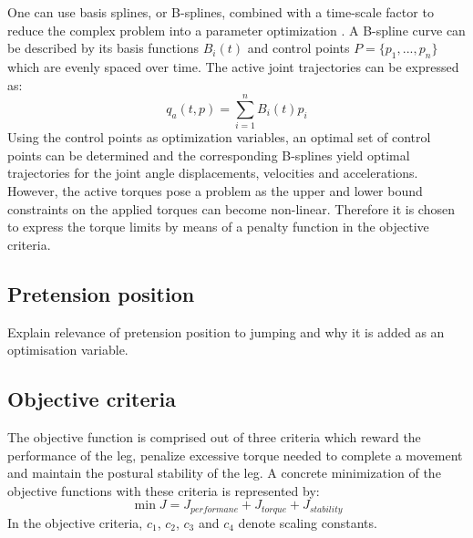 \documentclass[letterpaper, 10 pt, conference]{ieeeconf}  %
\begin{document}
One can use basis splines, or B-splines, combined with a time-scale factor to reduce the complex problem into a parameter optimization \cite{ude2000planning} \cite{babivc2009biarticulated} \cite{wang1999weight} \cite{albro2001optimal}. A B-spline curve can be described by its basis functions $B_i(t)$ and control points $P=\{p_1,...,p_n\}$ which are evenly spaced over time. The active joint trajectories can be expressed as:   
 \begin{equation}
q_a(t,p) = \sum_{i=1}^{n} B_i (t) p_i
\end{equation}
Using the control points as optimization variables, an optimal set of control points can be determined and the corresponding B-splines yield optimal trajectories for the joint angle displacements, velocities and accelerations. However, the active torques pose a problem as the upper and lower bound constraints on the applied torques can become non-linear. Therefore it is chosen to express the torque limits by means of a penalty function in the objective criteria.

\subsection{Pretension position}

Explain relevance of pretension position to jumping and why it is added as an optimisation variable.

\subsection{Objective criteria}

The objective function is comprised out of three criteria which reward the performance of the leg, penalize excessive torque needed to complete a movement and maintain the postural stability of the leg. A concrete minimization of the objective functions with these criteria is represented by:   
 \begin{equation}
\min\limits J =  J_{performane}+ J_{torque}+ J_{stability}
 \end{equation}
In the objective criteria, $c_1$, $c_2$, $c_3$ and $c_4$ denote scaling constants.\\
\end{document}
